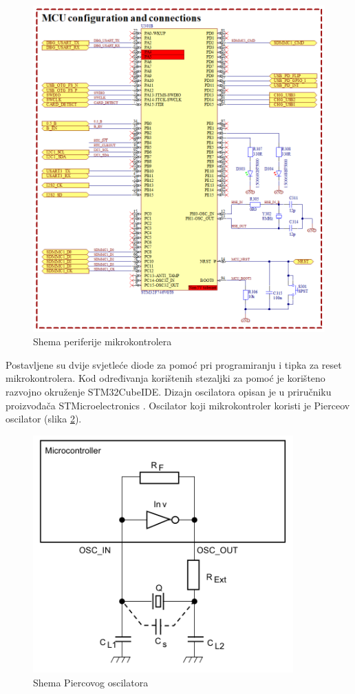\begin{figure}[hbt]
    \centering
    \includegraphics[width=\textwidth]{Figures/MCU_01.png}
    \caption{Shema periferije mikrokontrolera}
    \label{slk:MCU_PE}
\end{figure}

Postavljene su dvije svjetleće diode za pomoć pri programiranju i tipka za reset mikrokontrolera. Kod određivanja korištenih stezaljki za pomoć je korišteno razvojno okruženje STM32CubeIDE. Dizajn oscilatora opisan je u priručniku proizvođača STMicroelectronics \cite{stmicroelectronics:an2867}. Oscilator koji mikrokontroler koristi je Pierceov oscilator (slika \ref{slk:PIERCE}).
\begin{figure}[hbt]
    \centering
    \includegraphics[width=10cm]{Figures/pierce.PNG}
    \caption{Shema Piercovog oscilatora \cite{stmicroelectronics:an2867}}
    \label{slk:PIERCE}
\end{figure}

